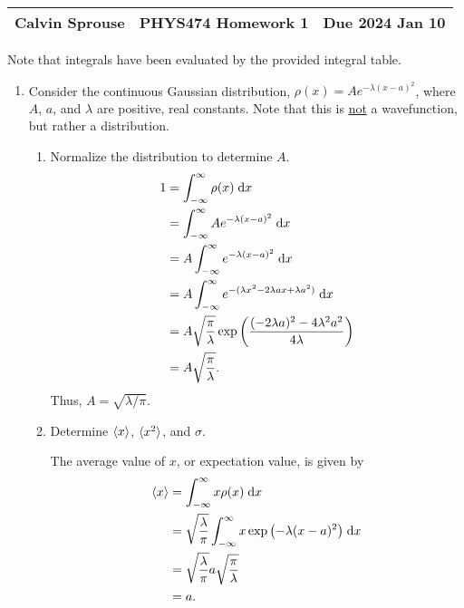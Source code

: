 \documentclass[a4paper, 12pt]{config/homework}
\begin{document}
\noindent
\begin{tabularx}{\textwidth}{>{\centering\arraybackslash}X>{\centering\arraybackslash}X>{\centering\arraybackslash}X}
Calvin Sprouse & PHYS474 Homework 1 & Due 2024 Jan 10\\
\midrule
\end{tabularx}

Note that integrals have been evaluated by the provided integral table.
\begin{enumerate}
\item Consider the continuous Gaussian distribution, \(\rho(x) = Ae^{-\lambda (x-a)^2}\), where \(A\), \(a\), and \(\lambda \) are positive, real constants. Note that this is \underline{not} a wavefunction, but rather a distribution.
\begin{enumerate}[label=(\alph*)]
\item Normalize the distribution to determine \(A\).
\begin{align*}
1 &= \bint{-\infty}{\infty}{\rho(x)}{x}
\\&= \bint{-\infty}{\infty}{Ae^{-\lambda (x-a)^2}}{x}
\\&= A \bint{-\infty}{\infty}{e^{-\lambda (x-a)^2}}{x}
\\&= A \bint{-\infty}{\infty}{e^{-(\lambda x^2 -2\lambda ax + \lambda a^2)}}{x}
\\&= A \sqrt{\frac{\pi}{\lambda}} \exp\left({\frac{(-2\lambda a)^2 - 4\lambda^2 a^2}{4\lambda}}\right)
\\&= A \sqrt{\frac{\pi}{\lambda}}.
\end{align*}
Thus, \(A = \sqrt{\lambda / \pi}\).

\item Determine \(\braket{x}\), \(\braket{x^2}\), and \(\sigma \).

The average value of \(x\), or expectation value, is given by
\begin{align*}
\braket{x} &= \bint{-\infty}{\infty}{x \rho(x)}{x}
\\&= \sqrt{\frac{\lambda}{\pi}} \bint{-\infty}{\infty}{x \exp{\left(-\lambda(x-a)^2\right)}}{x}
\\&= \sqrt{\frac{\lambda}{\pi}} a \sqrt{\frac{\pi}{\lambda}}
\\&= a.
\end{align*}


\end{enumerate}
\end{enumerate}
\end{document}
